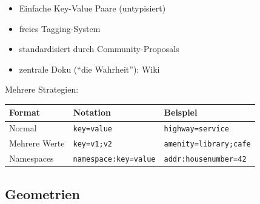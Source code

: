 \documentclass{beamer}
\begin{document}
			\begin{frame}
				\begin{itemize}
					\item Einfache Key-Value Paare (untypisiert)
					\item freies Tagging-System
					\item standardisiert durch Community-Proposals
					\item zentrale Doku (\enquote{die Wahrheit}): Wiki
				\end{itemize}
				\vspace{0.25cm}
				Mehrere Strategien:\\
				\vspace{0.25cm}
				\begin{tabular}{|l|l|l|}
					\hline
					\textbf{Format}	& \textbf{Notation}				& \textbf{Beispiel} \\
					\hline
					Normal			& \texttt{key=value}			& \texttt{highway=service} \\ 
					\hline 
					Mehrere Werte	& \texttt{key=v1;v2}			& \texttt{amenity=library;cafe} \\ 
					\hline 
					Namespaces		& \texttt{namespace:key=value}	& \texttt{addr:housenumber=42} \\ 
					\hline 
				\end{tabular}
			\end{frame}
		
		\subsection{Geometrien}
		
\end{document}
